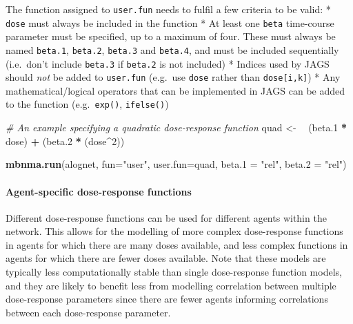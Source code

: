 \documentclass[]{article}
\newenvironment{Shaded}{\begin{snugshade}}{\end{snugshade}}
\newcommand{\CommentTok}[1]{\textcolor[rgb]{0.56,0.35,0.01}{\textit{#1}}}
\newcommand{\DataTypeTok}[1]{\textcolor[rgb]{0.13,0.29,0.53}{#1}}
\newcommand{\DecValTok}[1]{\textcolor[rgb]{0.00,0.00,0.81}{#1}}
\newcommand{\ErrorTok}[1]{\textcolor[rgb]{0.64,0.00,0.00}{\textbf{#1}}}
\newcommand{\FloatTok}[1]{\textcolor[rgb]{0.00,0.00,0.81}{#1}}
\newcommand{\KeywordTok}[1]{\textcolor[rgb]{0.13,0.29,0.53}{\textbf{#1}}}
\newcommand{\NormalTok}[1]{#1}
\newcommand{\OperatorTok}[1]{\textcolor[rgb]{0.81,0.36,0.00}{\textbf{#1}}}
\newcommand{\StringTok}[1]{\textcolor[rgb]{0.31,0.60,0.02}{#1}}
\let\oldparagraph\paragraph
\renewcommand{\paragraph}[1]{\oldparagraph{#1}\mbox{}}
\begin{document}
The function assigned to \texttt{user.fun} needs to fulfil a few
criteria to be valid: * \texttt{dose} must always be included in the
function * At least one \texttt{beta} time-course parameter must be
specified, up to a maximum of four. These must always be named
\texttt{beta.1}, \texttt{beta.2}, \texttt{beta.3} and \texttt{beta.4},
and must be included sequentially (i.e.~don't include \texttt{beta.3} if
\texttt{beta.2} is not included) * Indices used by JAGS should
\emph{not} be added to \texttt{user.fun} (e.g.~use \texttt{dose} rather
than \texttt{dose{[}i,k{]}}) * Any mathematical/logical operators that
can be implemented in JAGS can be added to the function
(e.g.~\texttt{exp()}, \texttt{ifelse()})

\begin{Shaded}
\begin{Highlighting}[]
\CommentTok{# An example specifying a quadratic dose-response function}
\NormalTok{quad <-}\StringTok{ }\ErrorTok{~}\StringTok{ }\NormalTok{(beta}\FloatTok{.1} \OperatorTok{*}\StringTok{ }\NormalTok{dose) }\OperatorTok{+}\StringTok{ }\NormalTok{(beta}\FloatTok{.2} \OperatorTok{*}\StringTok{ }\NormalTok{(dose}\OperatorTok{^}\DecValTok{2}\NormalTok{))}

\KeywordTok{mbnma.run}\NormalTok{(alognet, }\DataTypeTok{fun=}\StringTok{"user"}\NormalTok{, }\DataTypeTok{user.fun=}\NormalTok{quad,}
          \DataTypeTok{beta.1 =} \StringTok{"rel"}\NormalTok{, }\DataTypeTok{beta.2 =} \StringTok{"rel"}\NormalTok{)}
\end{Highlighting}
\end{Shaded}

\hypertarget{agent-specific-dose-response-functions}{%
\paragraph{Agent-specific dose-response
functions}\label{agent-specific-dose-response-functions}}

Different dose-response functions can be used for different agents
within the network. This allows for the modelling of more complex
dose-response functions in agents for which there are many doses
available, and less complex functions in agents for which there are
fewer doses available. Note that these models are typically less
computationally stable than single dose-response function models, and
they are likely to benefit less from modelling correlation between
multiple dose-response parameters since there are fewer agents informing
correlations between each dose-response parameter.
\end{document}
